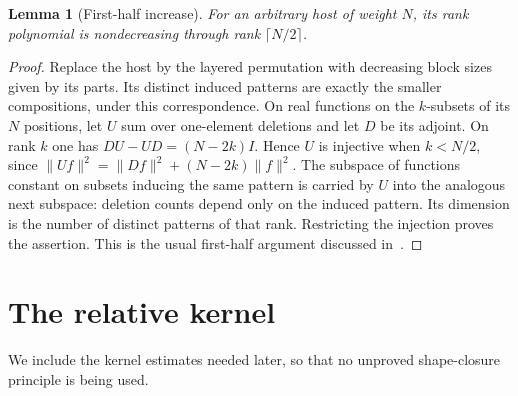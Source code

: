 \documentclass[11pt]{article}
\newtheorem{lemma}[theorem]{Lemma}
\theoremstyle{remark}\newtheorem{remark}[theorem]{Remark}
\begin{document}
\begin{lemma}[First-half increase]\label{lem:half}
For an arbitrary host of weight $N$, its rank polynomial is nondecreasing through rank $\lceil N/2\rceil$.
\end{lemma}
\begin{proof}
Replace the host by the layered permutation with decreasing block sizes given by its parts. Its distinct induced patterns are exactly the smaller compositions, under this correspondence. On real functions on the $k$-subsets of its $N$ positions, let $U$ sum over one-element deletions and let $D$ be its adjoint. On rank $k$ one has $DU-UD=(N-2k)I$. Hence $U$ is injective when $k<N/2$, since $\|Uf\|^2=\|Df\|^2+(N-2k)\|f\|^2$. The subspace of functions constant on subsets inducing the same pattern is carried by $U$ into the analogous next subspace: deletion counts depend only on the induced pattern. Its dimension is the number of distinct patterns of that rank. Restricting the injection proves the assertion. This is the usual first-half argument discussed in~\cite{Vatter}.
\end{proof}



\section{The relative kernel}\label{sec:kernel}
We include the kernel estimates needed later, so that no unproved shape-closure principle is being used.
\end{document}
